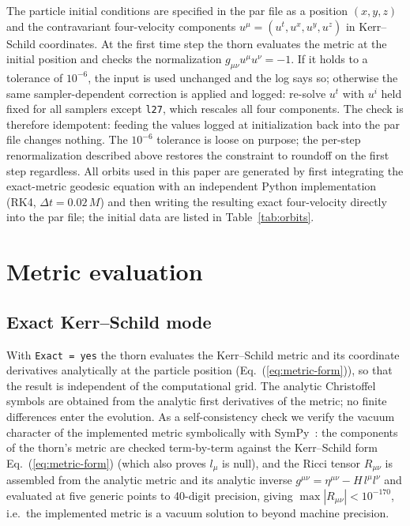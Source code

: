 \documentclass[11pt]{article}
\begin{document}
The particle initial conditions are specified in the par file as a position
$(x,y,z)$ and the contravariant four-velocity components
$u^\mu=(u^t,u^x,u^y,u^z)$ in Kerr--Schild coordinates.  At the first time
step the thorn evaluates the metric at the initial position and checks the
normalization $g_{\mu\nu}u^\mu u^\nu = -1$.  If it holds to a tolerance of
$10^{-6}$, the input is used unchanged and the log says so; otherwise the
same sampler-dependent correction is applied and logged: re-solve $u^t$ with
$u^i$ held fixed for all samplers except \texttt{l27}, which rescales all
four components.  The check is therefore idempotent: feeding the values
logged at initialization back into the par file changes nothing.  The
$10^{-6}$ tolerance is loose on purpose; the per-step renormalization
described above restores the constraint to roundoff on the first step
regardless.  All orbits used in this paper are
generated by first integrating the exact-metric geodesic equation with an
independent Python implementation (RK4, $\Delta t = 0.02\,M$) and then
writing the resulting exact four-velocity directly into the par file; the
initial data are listed in Table~\ref{tab:orbits}.

\section{Metric evaluation}\label{sec:metric}

\subsection{Exact Kerr--Schild mode}\label{sec:exactmetric}

With \texttt{Exact = yes} the thorn evaluates the Kerr--Schild metric and
its coordinate derivatives analytically at the particle position
(Eq.~(\ref{eq:metric-form})), so that the result is independent of the computational grid.
The analytic Christoffel symbols are obtained from the analytic first
derivatives of the metric; no finite differences enter the evolution.  As a
self-consistency check we verify the vacuum character of the implemented
metric symbolically with SymPy~\citep{sympy}: the components of the
thorn's metric are checked term-by-term against the Kerr--Schild form
Eq.~(\ref{eq:metric-form}) (which also proves $l_\mu$ is null), and the
Ricci tensor $R_{\mu\nu}$ is assembled from the analytic metric and its
analytic inverse $g^{\mu\nu} = \eta^{\mu\nu} - H\,l^\mu l^\nu$ and evaluated
at five generic points to 40-digit precision, giving
$\max|R_{\mu\nu}| < 10^{-170}$, i.e.\ the implemented metric is a vacuum
solution to beyond machine precision.
\end{document}
